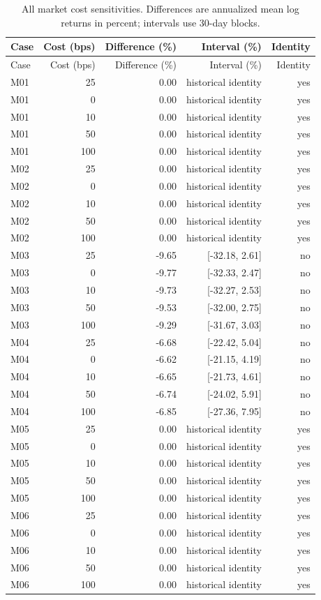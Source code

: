 \begingroup\small\begin{longtable}{lrrrr}
\caption{All market cost sensitivities. Differences are annualized mean log returns in percent; intervals use 30-day blocks.}\\
\toprule Case & Cost (bps) & Difference (\%) & Interval (\%) & Identity\\\midrule\endfirsthead
\toprule Case & Cost (bps) & Difference (\%) & Interval (\%) & Identity\\\midrule\endhead
M01 & 25 & 0.00 & historical identity & yes\\
M01 & 0 & 0.00 & historical identity & yes\\
M01 & 10 & 0.00 & historical identity & yes\\
M01 & 50 & 0.00 & historical identity & yes\\
M01 & 100 & 0.00 & historical identity & yes\\
M02 & 25 & 0.00 & historical identity & yes\\
M02 & 0 & 0.00 & historical identity & yes\\
M02 & 10 & 0.00 & historical identity & yes\\
M02 & 50 & 0.00 & historical identity & yes\\
M02 & 100 & 0.00 & historical identity & yes\\
M03 & 25 & -9.65 & [-32.18, 2.61] & no\\
M03 & 0 & -9.77 & [-32.33, 2.47] & no\\
M03 & 10 & -9.73 & [-32.27, 2.53] & no\\
M03 & 50 & -9.53 & [-32.00, 2.75] & no\\
M03 & 100 & -9.29 & [-31.67, 3.03] & no\\
M04 & 25 & -6.68 & [-22.42, 5.04] & no\\
M04 & 0 & -6.62 & [-21.15, 4.19] & no\\
M04 & 10 & -6.65 & [-21.73, 4.61] & no\\
M04 & 50 & -6.74 & [-24.02, 5.91] & no\\
M04 & 100 & -6.85 & [-27.36, 7.95] & no\\
M05 & 25 & 0.00 & historical identity & yes\\
M05 & 0 & 0.00 & historical identity & yes\\
M05 & 10 & 0.00 & historical identity & yes\\
M05 & 50 & 0.00 & historical identity & yes\\
M05 & 100 & 0.00 & historical identity & yes\\
M06 & 25 & 0.00 & historical identity & yes\\
M06 & 0 & 0.00 & historical identity & yes\\
M06 & 10 & 0.00 & historical identity & yes\\
M06 & 50 & 0.00 & historical identity & yes\\
M06 & 100 & 0.00 & historical identity & yes\\
\bottomrule\end{longtable}\endgroup
